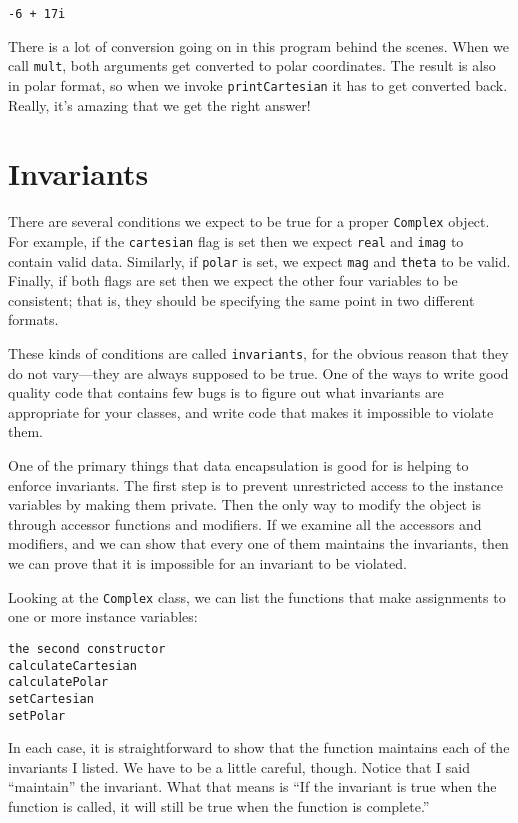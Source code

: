 \begin{lstlisting}
-6 + 17i
\end{lstlisting}
%
There is a lot of conversion going on in this program behind the
scenes.  When we call {\tt mult}, both arguments get converted to
polar coordinates.  The result is also in polar format, so when we
invoke {\tt printCartesian} it has to get converted back.  Really,
it's amazing that we get the right answer!


\section{Invariants}

There are several conditions we expect to be true for a proper
{\tt Complex} object.  For example, if the {\tt cartesian} flag
is set then we expect {\tt real} and {\tt imag} to contain valid
data.  Similarly, if {\tt polar} is set, we expect {\tt mag}
and {\tt theta} to be valid.  Finally, if both flags are set
then we expect the other four variables to be consistent;
that is, they should be specifying the same point in two different
formats.

These kinds of conditions are called {\tt invariants}, for the obvious
reason that they do not vary---they are always supposed to be true.
One of the ways to write good quality code that contains few bugs
is to figure out what invariants are appropriate for your classes,
and write code that makes it impossible to violate them.


One of the primary things that data encapsulation is good for
is helping to enforce invariants.  The first step is to prevent
unrestricted access to the instance variables by making them
private.  Then the only way to modify the object is through
accessor functions and modifiers.  If we examine all the accessors
and modifiers, and we can show that every one of them maintains
the invariants, then we can prove that it is impossible for
an invariant to be violated.

Looking at the {\tt Complex} class, we can list the functions
that make assignments to one or more instance variables:

\begin{lstlisting}
the second constructor
calculateCartesian
calculatePolar
setCartesian
setPolar
\end{lstlisting}
%
In each case, it is straightforward to show that the function
maintains each of the invariants I listed.  We have to be a little
careful, though.  Notice that I said ``maintain'' the invariant.
What that means is ``If the invariant is true when the function
is called, it will still be true when the function is complete.''

